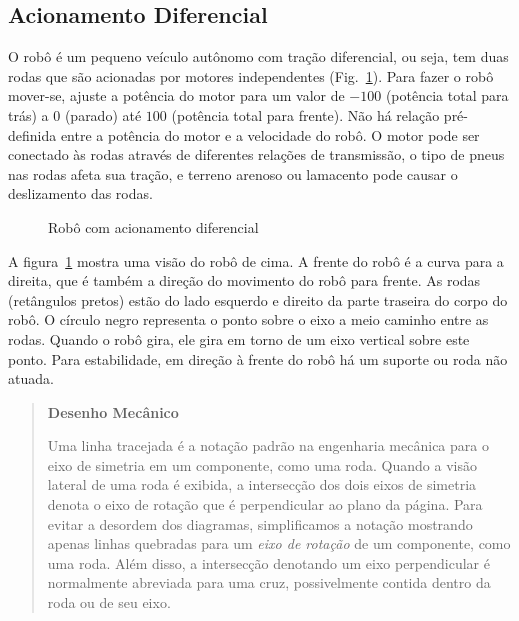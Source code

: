 \subsection{Acionamento Diferencial}

O robô é um pequeno veículo autônomo com tração diferencial, ou seja, tem duas rodas que são acionadas por motores independentes (Fig.~\ref{fig.differential}). Para fazer o robô mover-se, ajuste a potência do motor para um valor de $-100$ (potência total para trás) a $0$ (parado) até $100$ (potência total para frente). Não há relação pré-definida entre a potência do motor e a velocidade do robô. O motor pode ser conectado às rodas através de diferentes relações de transmissão, o tipo de pneus nas rodas afeta sua tração, e terreno arenoso ou lamacento pode causar o deslizamento das rodas.

\begin{figure}
\begin{center}
\end{center}
\caption{Robô com acionamento diferencial\label{fig.differential}}
\end{figure}

A figura~\ref{fig.differential} mostra uma visão do robô de cima. A frente do robô é a curva para a direita, que é também a direção do movimento do robô para frente. As rodas (retângulos pretos) estão do lado esquerdo e direito da parte traseira do corpo do robô. O círculo negro representa o ponto sobre o eixo a meio caminho entre as rodas. Quando o robô gira, ele gira em torno de um eixo vertical sobre este ponto. Para estabilidade, em direção à frente do robô há um suporte ou roda não atuada.

\begin{quote}
\begin{center}
\textbf{Desenho Mecânico}
\end{center}
Uma linha tracejada é a notação padrão na engenharia mecânica para o eixo de simetria em um componente, como uma roda. Quando a visão lateral de uma roda é exibida, a intersecção dos dois eixos de simetria denota o eixo de rotação que é perpendicular ao plano da página. Para evitar a desordem dos diagramas, simplificamos a notação mostrando apenas linhas quebradas para um \emph{eixo de rotação} de um componente, como uma roda. Além disso, a intersecção denotando um eixo perpendicular é normalmente abreviada para uma cruz, possivelmente contida dentro da roda ou de seu eixo.
\end{quote}

